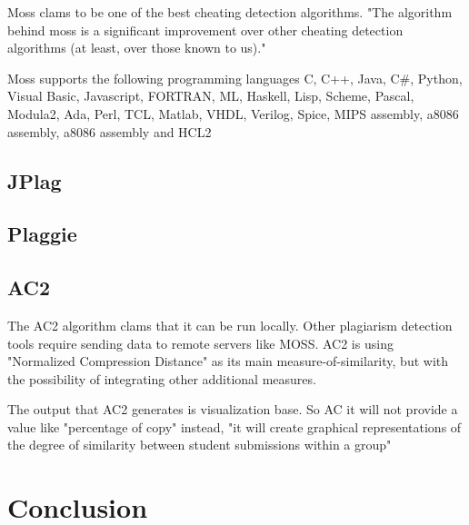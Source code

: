 \documentclass[a4paper, 11pt]{article}
\renewcommand{\\}{\vspace*{0.5\baselineskip} \newline}
\begin{document}
Moss clams to be one of the best cheating detection algorithms.
"The algorithm behind moss is a significant improvement over other cheating detection algorithms (at least, over those known to us)."
\autocite{SMOSS}

Moss supports the following programming languages C, C++, Java, C\#, Python, Visual Basic, Javascript, FORTRAN, ML, Haskell, Lisp, Scheme, Pascal, Modula2, Ada, Perl, TCL, Matlab, VHDL, Verilog, Spice, MIPS assembly, a8086 assembly, a8086 assembly and HCL2

\subsection{JPlag}

\subsection{Plaggie}

\subsection{AC2}

The AC2 algorithm clams that it can be run locally. Other plagiarism detection tools require sending data to remote servers like MOSS.
AC2 is using "Normalized Compression Distance" as its main measure-of-similarity, but with the possibility of integrating other additional measures. 

The output that AC2 generates is visualization base. So AC it will not provide a value like "percentage of copy" instead, "it will create graphical representations of the degree of similarity between student submissions within a group" \autocite{AC2}   

\section{Conclusion}

\newpage

\printbibliography[
	heading=bibintoc,
	title={References}
]

\appendix
\end{document}
